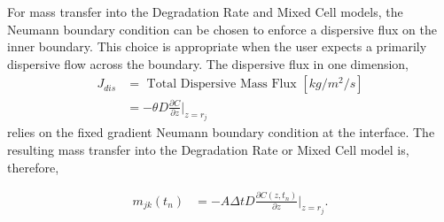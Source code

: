 
For mass transfer into the Degradation Rate and Mixed Cell models, the Neumann 
boundary condition can be chosen to enforce a dispersive flux on the inner 
boundary. This choice is appropriate when the user expects a primarily 
dispersive flow across the boundary. The dispersive flux in one dimension, 
\begin{align}
      J_{dis} &= \mbox{ Total Dispersive Mass Flux }[kg/m^2/s]\nonumber\\
      &= -\theta D\frac{\partial C}{\partial z}\Big|_{z=r_j} \nonumber
\end{align}
relies on the fixed gradient Neumann boundary condition at the interface. 
The resulting mass transfer into the Degradation Rate or Mixed Cell model is, 
therefore, 

\begin{align}
m_{jk}(t_n) &= - A\Delta t D \frac{\partial C(z,t_n)}{\partial z}|_{z=r_j}.
\end{align}
